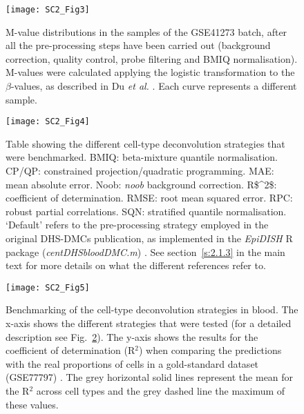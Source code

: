 \begin{figure}[htbp!] 
	\centering    
	\texttt{[image: SC2\_Fig3]}
	\caption[M-value distributions in the GSE41273 batch]{M-value distributions in the samples of the GSE41273 batch, after all the pre-processing steps have been carried out (background correction, quality control, probe filtering and BMIQ normalisation). M-values were calculated applying the logistic transformation to the $\beta$-values, as described in Du \textit{et al.} \cite{Du2010}. Each curve represents a different sample.}
	\label{fig:sc2_fig3}
\end{figure}

\begin{figure}[htbp!] 
	\centering    
	\texttt{[image: SC2\_Fig4]}
	\caption[Cell-type deconvolution strategies that were benchmarked]{Table showing the different cell-type deconvolution strategies that were benchmarked. BMIQ: beta-mixture quantile normalisation. \acrshort{CP/QP}: constrained projection/quadratic programming. \acrshort{MAE}: mean absolute error. Noob: \textit{noob} background correction.  \acrshort{R$^2$}: coefficient of determination. \acrshort{RMSE}: root mean squared error. \acrshort{RPC}: robust partial correlations. \acrshort{SQN}: stratified quantile normalisation. `Default' refers to the pre-processing strategy employed in the original DHS-DMCs publication, as implemented in the \textit{EpiDISH} R package (\textit{centDHSbloodDMC.m}) \cite{Teschendorff2017a,Teschendorff2017b}. See section~\ref{s:2.1.3} in the main text for more details on what the different references refer to.}
	\label{fig:sc2_fig4}
\end{figure}

\begin{figure}[htbp!] 
	\centering    
	\texttt{[image: SC2\_Fig5]}
	\caption[Benchmarking of the cell-type deconvolution strategies in blood: R$^2$]{Benchmarking of the cell-type deconvolution strategies in blood. The x-axis shows the different strategies that were tested (for a detailed description see Fig.~\ref{fig:sc2_fig4}). The y-axis shows the results for the coefficient of determination (R$^2$) when comparing the predictions with the real proportions of cells in a gold-standard dataset (GSE77797) \cite{Koestler2016}. The grey horizontal solid lines represent the mean for the R$^2$ across cell types and the grey dashed line the maximum of these values.}
	\label{fig:sc2_fig5}
\end{figure}

